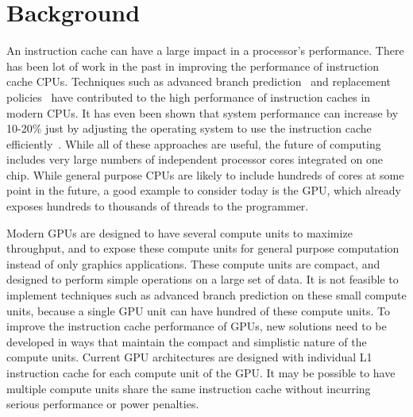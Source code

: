 \section{Background}

An instruction cache can have a large impact in a processor's
performance. 
There has been lot of work in the past in improving the performance
of instruction cache  CPUs. 
Techniques such as advanced branch prediction~\cite{yeh93} and
replacement policies~\cite{smith85} have contributed to the high
performance of instruction caches in modern CPUs. 
It has even been shown that system performance can increase by 10-20\%
just by adjusting the operating system to use the instruction cache
efficiently~\cite{torrellas98}.
While all of these approaches are useful, the future of computing
includes very large numbers of independent processor cores integrated
on one chip.
While general purpose CPUs are likely to include hundreds of cores at
some point in the future, a good example to consider today is the GPU,
which already exposes hundreds to thousands of threads to the
programmer. 

Modern GPUs are designed to have several
compute units to maximize throughput, and to expose these compute
units for general purpose computation instead of only graphics
applications.
These compute units are compact, and designed to perform simple
operations on a large set of data. 
It is not feasible to implement techniques such as advanced branch
prediction on these small compute units, because a single GPU unit
can have hundred of these compute units. 
To improve the instruction cache performance of GPUs, new solutions
need to be developed in ways that maintain the compact and simplistic
nature of the compute units. 
Current GPU architectures are designed with individual L1 instruction
cache for each compute unit of the GPU\cite{keckler11}. 
It may be possible to have multiple compute units share the same
instruction cache without incurring serious performance or power
penalties.
